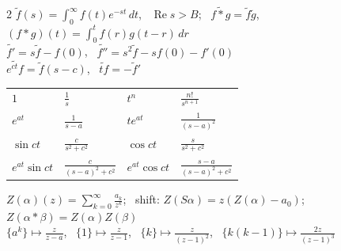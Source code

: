 \begin{multicols}{2}
$\tilde f(s) = \displaystyle\int_0^\infty f(t)e^{-st}\,dt$, \ $\operatorname{Re} s > B$; \ $\widetilde{f * g} = \tilde f\tilde g$, $(f * g)(t) = \int_0^t f(r)g(t - r)\,dr$ \\
$\widetilde{f'} = s\tilde f - f(0)$, \ $\widetilde{f''} = s^2\tilde f - sf(0) - f'(0)$ \\
$\widetilde{e^{ct}f} = \tilde f(s - c)$, \ $\widetilde{tf} = -\tilde f'$ \\
\begin{tabular}{@{}llll@{}}
  $1$ & $\frac1s$ & $t^n$ & $\frac{n!}{s^{n+1}}$ \\[0.6ex]
  $e^{at}$ & $\frac{1}{s - a}$ & $t e^{at}$ & $\frac{1}{(s - a)^2}$ \\[0.6ex]
  $\sin ct$ & $\frac{c}{s^2 + c^2}$ & $\cos ct$ & $\frac{s}{s^2 + c^2}$ \\[0.6ex]
  $e^{at}\sin ct$ & $\frac{c}{(s - a)^2 + c^2}$ & $e^{at}\cos ct$ & $\frac{s - a}{(s - a)^2 + c^2}$
\end{tabular}

$Z(\alpha)(z) = \displaystyle\sum_{k=0}^\infty \frac{a_k}{z^k}$; \ shift: $Z(S\alpha) = z(Z(\alpha) - a_0)$; \ $Z(\alpha * \beta) = Z(\alpha)Z(\beta)$ \\
$\{a^k\} \mapsto \frac{z}{z - a}$, \ $\{1\} \mapsto \frac{z}{z - 1}$, \ $\{k\} \mapsto \frac{z}{(z - 1)^2}$, \ $\{k(k-1)\} \mapsto \frac{2z}{(z - 1)^3}$

\end{multicols}
